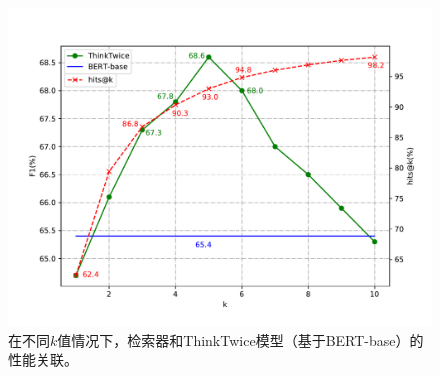 \begin{figure}[htbp]
    \centering
    \includegraphics[scale=0.7]{figure/3-2.pdf}
    \caption{在不同$k$值情况下，检索器和ThinkTwice模型（基于BERT-base）的性能关联。}
    \label{fig:3-2}
\end{figure}
